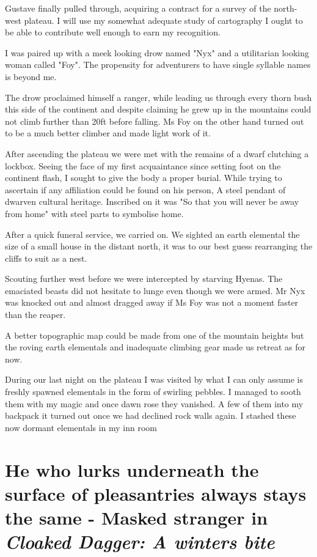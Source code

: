 \documentclass{article}
\begin{document}
Gustave finally pulled through, acquiring a contract for a survey of the north-west plateau. I will use my somewhat adequate study of cartography I ought to be able to contribute well enough to earn my recognition.

I was paired up with a meek looking drow named "Nyx" and a utilitarian looking woman called "Foy". The propensity for adventurers to have single syllable names is beyond me. 

The drow proclaimed himself a ranger, while leading us through every thorn bush this side of the continent and despite claiming he grew up in the mountains could not climb further than 20ft before falling. Ms Foy on the other hand turned out to be a much better climber and made light work of it.

After ascending the plateau we were met with the remains of a dwarf clutching a lockbox. Seeing the face of my first acquaintance since setting foot on the continent flash, I sought to give the body a proper burial. While trying to ascertain if any affiliation could be found on his person, A steel pendant of dwarven cultural heritage. Inscribed on it was "So that you will never be away from home" with steel parts to symbolise home.

After a quick funeral service, we carried on. We sighted an earth elemental the size of a small house in the distant north, it was to our best guess rearranging the cliffs to suit as a nest. 

Scouting further west before we were intercepted by starving Hyenas. The emaciated beasts did not hesitate to lunge even though we were armed. Mr Nyx was knocked out and almost dragged away if Ms Foy was not a moment faster than the reaper. 

A better topographic map could be made from one of the mountain heights but the roving earth elementals and inadequate climbing gear made us retreat as for now. 

During our last night on the plateau I was visited by what I can only assume is freshly spawned elementals in the form of swirling pebbles. I managed to sooth them with my magic and once dawn rose they vanished. A few of them into my backpack it turned out once we had declined rock walls again. I stashed these now dormant elementals in my inn room 

\section*{He who lurks underneath the surface of pleasantries always stays the same - Masked stranger in \textit{Cloaked Dagger: A winters bite}}
\end{document}
